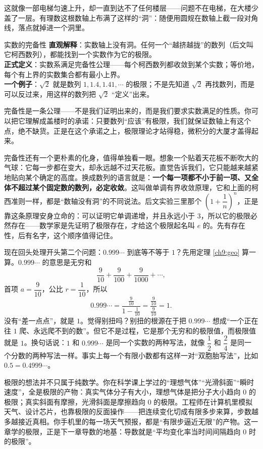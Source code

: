 这就像一部电梯匀速上升，却一直到达不了任何楼层——问题不在电梯，在大楼少盖了一层。有理数这根数轴上布满了这样的“洞”：随便用圆规在数轴上截一段对角线，落点就掉进一个洞里。

\begin{shuyu}{实数的完备性}
\textbf{直观解释}：实数轴上没有洞。任何一个“越挤越拢”的数列（后文叫它柯西数列），都能找到一个实数作为它的极限。\\
\textbf{正式定义}：实数系满足完备性公理——每个柯西数列都收敛到某个实数；等价地，每个有上界的实数集合都有最小上界。\\
\textbf{一个例子}：$\sqrt{2}$ 就是数列 $1,1.4,1.41,\cdots$ 的极限；不是先知道 $\sqrt{2}$ 再找数列，而是可以反过来，用这样的数列把 $\sqrt{2}$ “定义”出来。
\end{shuyu}

完备性是一条公理——不是我们证明出来的，而是我们要求实数满足的性质。你可以把它理解成盖楼时的承诺：只要数列“应该”有极限，我们就保证数轴上有这个点，绝不缺货。正是在这个承诺之上，极限理论才站得稳，微积分的大厦才盖得起来。

完备性还有一个更朴素的化身，值得单独看一眼。想象一个贴着天花板不断吹大的气球：它每一步都在变大，却永远越不过天花板。直觉告诉我们，它只能越来越紧地贴向某个确定的高度。换成数列的语言就是：\textbf{一个每一项都不小于前一项、又全体不超过某个固定数的数列，必定收敛}。这叫做单调有界收敛原理，它和上面的柯西准则一样，都是“数轴没有洞”的不同说法。后文实验三里那个 $\left(1+\dfrac{1}{n}\right)^n$，正是靠这条原理安身立命的：可以证明它单调递增，并且永远小于 $3$，所以它的极限必然存在——数学家是先证明了极限存在，才给这个极限起名叫 $e$ 的。先有存在性，后有名字，这个顺序值得记住。

现在回头处理开头第二个问题：$0.999\cdots$ 到底等不等于 $1$？先用定理 \ref{ch9:geo} 算一算。$0.999\cdots$ 的意思是无穷和
\[
\frac{9}{10}+\frac{9}{100}+\frac{9}{1000}+\cdots,
\]
首项 $a=\dfrac{9}{10}$，公比 $r=\dfrac{1}{10}$，所以
\[
0.999\cdots=\frac{\frac{9}{10}}{1-\frac{1}{10}}=\frac{\frac{9}{10}}{\frac{9}{10}}=1.
\]
没有“差一点点”，就是 $1$。觉得别扭吗？别扭的根源在于把 $0.999\cdots$ 想成“一个正在往 $1$ 爬、永远爬不到的数”。但它不是过程，它是那个无穷和的极限值，而极限值就是 $1$。换句话说：$1$ 和 $0.999\cdots$ 是同一个实数的两种写法，就像 $\dfrac{1}{2}$ 和 $\dfrac{2}{4}$ 是同一个分数的两种写法一样。事实上每一个有限小数都有这样一对“双胞胎写法”，比如 $0.5=0.4999\cdots$。

\begin{lianjie}
极限的想法并不只属于纯数学。你在科学课上学过的“理想气体”“光滑斜面”“瞬时速度”，全是极限的产物：真实气体分子有大小，理想气体是把分子大小趋向 $0$ 的极限；真实斜面有摩擦，光滑斜面是摩擦趋向 $0$ 的极限。工程师在计算机里模拟天气、设计芯片，也靠极限的反面操作——把连续变化切成有限多步来算，步数越多越接近真相。你手机里的每一场天气预报，都是“有限步逼近无限”的产物。这一章学的极限，正是下一章导数的地基：导数就是“平均变化率当时间间隔趋向 $0$ 时的极限”。
\end{lianjie}

